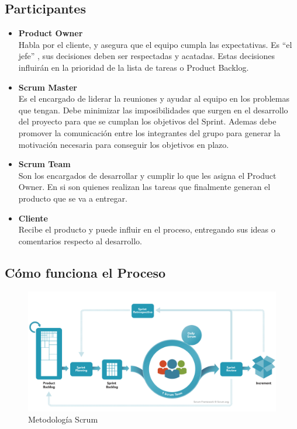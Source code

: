 \subsection{Participantes}
\begin{itemize}
\item \textbf{Product Owner}\\
Habla por el cliente, y asegura que el equipo cumpla las expectativas. Es “el jefe” , sus decisiones deben ser
respectadas y acatadas. Estas  decisiones influirán en la prioridad de la lista de tareas o Product Backlog.



\item \textbf{Scrum Master}\\
Es el encargado de liderar la reuniones y ayudar al equipo en los problemas que tengan. Debe minimizar las imposibilidades que surgen en el desarrollo del proyecto para que se cumplan los objetivos del Sprint. Ademas debe promover la comunicación entre los integrantes del grupo para generar la motivación necesaria para conseguir los objetivos en plazo.




\item  \textbf{Scrum Team}\\
Son los encargados de desarrollar y cumplir lo que les asigna el Product Owner. En si son quienes realizan las tareas que finalmente generan el producto que se va a entregar.


\item  \textbf{Cliente}\\
Recibe el producto y puede influir en el proceso, entregando sus ideas o comentarios respecto al desarrollo.
\end{itemize}

\subsection{Cómo funciona el Proceso}



\begin{figure}[H]
		\centering
		\includegraphics[width=1.1\textwidth] {scrum.jpg}
		\caption{Metodología Scrum }
	\end{figure} 


